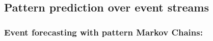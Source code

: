 \subsection{Pattern prediction over event streams}


\subsubsection*{Event forecasting with pattern Markov Chains:}